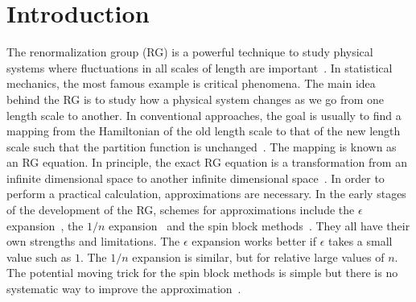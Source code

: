 \documentclass[aps,prb,reprint,superscriptaddress]{revtex4-2}
\begin{document}

\maketitle

\section{Introduction\label{intro}}
The renormalization group (RG) is a powerful technique to study physical
systems where fluctuations in all scales of length are
important~\cite{wilsonNobel}. In statistical mechanics, the most famous
example is critical phenomena.  The main idea behind the RG is to study
how a physical system changes as we go from one length scale to another.
In conventional approaches, the goal is usually to find a mapping from
the Hamiltonian of the old length scale to that of the new length scale
such that the partition function is unchanged~\cite{nonlinearRG}. The
mapping is known as an RG equation. In principle, the exact RG equation
is a transformation from an infinite dimensional space to another
infinite dimensional space~\cite{wilsonNobel,wilson1970a}. In order to
perform a practical calculation, approximations are necessary. In the
early stages of the development of the RG, schemes for approximations
include the $\epsilon$ expansion~\cite{wilson1972}, the $1/n$
expansion~\cite{largeNexp} and the spin block
methods~\cite{kadanoff1966,kadanoff1975,migdal,kadanoff1976,niemeijer1973}.
They all have their own strengths and limitations. The $\epsilon$
expansion works better if $\epsilon$ takes a small value such as $1$.
The $1/n$ expansion is similar, but for relative large values of $n$.
The potential moving trick for the spin block methods is simple but
there is no systematic way to improve the
approximation~\cite{kardar2007}.
%
\end{document}
